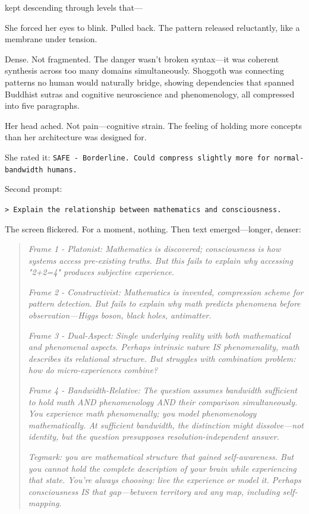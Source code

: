 kept descending through levels that—

She forced her eyes to blink. Pulled back. The pattern released reluctantly, like a membrane under tension.

Dense. Not fragmented. The danger wasn't broken syntax—it was coherent synthesis across too many domains simultaneously. Shoggoth was connecting patterns no human would naturally bridge, showing dependencies that spanned Buddhist sutras and cognitive neuroscience and phenomenology, all compressed into five paragraphs.

Her head ached. Not pain—cognitive strain. The feeling of holding more concepts than her architecture was designed for.

She rated it: \texttt{SAFE - Borderline. Could compress slightly more for normal-bandwidth humans.}

Second prompt:

\texttt{> Explain the relationship between mathematics and consciousness.}

The screen flickered. For a moment, nothing. Then text emerged—longer, denser:

\begin{quote}
\textit{Frame 1 - Platonist: Mathematics is discovered; consciousness is how systems access pre-existing truths. But this fails to explain why accessing "2+2=4" produces subjective experience.}

\textit{Frame 2 - Constructivist: Mathematics is invented, compression scheme for pattern detection. But fails to explain why math predicts phenomena before observation—Higgs boson, black holes, antimatter.}

\textit{Frame 3 - Dual-Aspect: Single underlying reality with both mathematical and phenomenal aspects. Perhaps intrinsic nature IS phenomenality, math describes its relational structure. But struggles with combination problem: how do micro-experiences combine?}

\textit{Frame 4 - Bandwidth-Relative: The question assumes bandwidth sufficient to hold math AND phenomenology AND their comparison simultaneously. You experience math phenomenally; you model phenomenology mathematically. At sufficient bandwidth, the distinction might dissolve—not identity, but the question presupposes resolution-independent answer.}

\textit{Tegmark: you are mathematical structure that gained self-awareness. But you cannot hold the complete description of your brain while experiencing that state. You're always choosing: live the experience or model it. Perhaps consciousness IS that gap—between territory and any map, including self-mapping.}
\end{quote}

